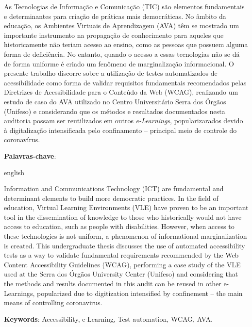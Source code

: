 \documentclass[
	12pt,				%
	openright,			%
	oneside,			%
	a4paper,			%
	chapter=TITLE,		%
	section=TITLE,		%
	subsection=TITLE,	%
	subsubsection=TITLE,%
	english,			%
	brazil				%
	]{abntex2}
\theoremstyle{definition}
\begin{document}
\setlength{\absparsep}{18pt} %
\begin{resumo}

As Tecnologias de Informação e Comunicação (TIC) são elementos fundamentais e determinantes para criação de práticas mais democráticas. No âmbito da educação, os Ambientes Virtuais de Aprendizagem (AVA) têm se mostrado um importante instrumento na propagação de conhecimento para aqueles que historicamente não teriam acesso ao ensino, como as pessoas que possuem alguma forma de deficiência. No entanto, quando o acesso a essas tecnologias não se dá de forma uniforme é criado um fenômeno de marginalização informacional. O presente trabalho discorre sobre a utilização de testes automatizados de acessibilidade como forma de validar requisitos fundamentais recomendados pelas Diretrizes de Acessibilidade para o Conteúdo da Web (WCAG), realizando um estudo de caso do AVA utilizado no Centro Universitário Serra dos Órgãos (Unifeso) e considerando que os métodos e resultados documentados nesta auditoria possam ser reutilizados em outros \textit{e-Learnings}, popularizarados devido à digitalização intensificada pelo confinamento – principal meio de controle do coronavírus.

 \textbf{Palavras-chave}: \imprimirpalavraschave
\end{resumo}

\begin{resumo}[Abstract]
 \begin{otherlanguage*}{english}
  
Information and Communications Technology (ICT) are fundamental and determinant elements to build more democratic practices. In the field of education, Virtual Learning Environments (VLE) have proven to be an important tool in the dissemination of knowledge to those who historically would not have access to education, such as people with disabilities. However, when access to these technologies is not uniform, a phenomenon of informational marginalization is created. This undergraduate thesis discusses the use of automated accessibility tests as a way to validate fundamental requirements recommended by the Web Content Accessibility Guidelines (WCAG), performing a case study of the VLE used at the Serra dos Órgãos University Center (Unifeso) and considering that the methods and results documented in this audit can be reused in other e-Learnings, popularized due to digitization intensified by confinement – the main means of controlling coronavirus.

   \vspace{\onelineskip}
 
   \noindent 
   \textbf{Keywords}: Accessibility, e-Learning, Test automation, WCAG, AVA.
 \end{otherlanguage*}
\end{resumo}
\end{document}
